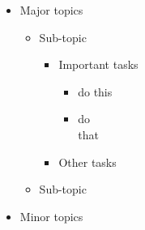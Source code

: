 \documentclass[a4paper]{article}
\begin{document}
\renewcommand{\labelitemiii}{$\Omega$}
\begin{itemize}
	\item Major topics
	\begin{itemize}
		\item Sub-topic
		\begin{itemize}
			\item Important tasks
			\begin{itemize}
				\item do this
				\item do\\that
			\end{itemize}
			\item Other tasks
		\end{itemize}
		\item Sub-topic
	\end{itemize}
	\item Minor topics
\end{itemize}
\end{document}
